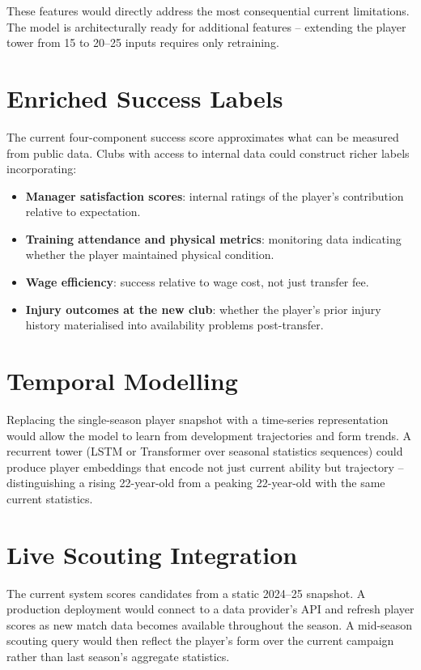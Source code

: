 \documentclass[12pt, a4paper, oneside]{report}
\begin{document}
These features would directly address the most consequential current limitations. The model is architecturally ready for additional features -- extending the player tower from 15 to 20--25 inputs requires only retraining.

\section{Enriched Success Labels}

The current four-component success score approximates what can be measured from public data. Clubs with access to internal data could construct richer labels incorporating:

\begin{itemize}[leftmargin=2em]
    \item \textbf{Manager satisfaction scores}: internal ratings of the player's contribution relative to expectation.
    \item \textbf{Training attendance and physical metrics}: monitoring data indicating whether the player maintained physical condition.
    \item \textbf{Wage efficiency}: success relative to wage cost, not just transfer fee.
    \item \textbf{Injury outcomes at the new club}: whether the player's prior injury history materialised into availability problems post-transfer.
\end{itemize}

\section{Temporal Modelling}

Replacing the single-season player snapshot with a time-series representation would allow the model to learn from development trajectories and form trends. A recurrent tower (LSTM or Transformer over seasonal statistics sequences) could produce player embeddings that encode not just current ability but trajectory -- distinguishing a rising 22-year-old from a peaking 22-year-old with the same current statistics.

\section{Live Scouting Integration}

The current system scores candidates from a static 2024--25 snapshot. A production deployment would connect to a data provider's API and refresh player scores as new match data becomes available throughout the season. A mid-season scouting query would then reflect the player's form over the current campaign rather than last season's aggregate statistics.
\end{document}
